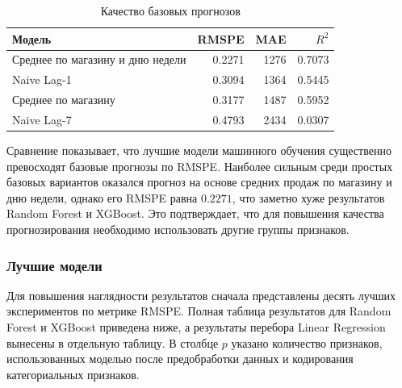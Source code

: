 \documentclass[12pt,a4paper]{article}
\numberwithin{equation}{section}
\begin{document}
\begin{table}[H]
\centering
\caption{Качество базовых прогнозов}
\label{tab:naive_baselines}
\begin{tabular}{l r r r}
\toprule
Модель & RMSPE & MAE & $R^2$ \\
\midrule
Среднее по магазину и дню недели & 0.2271 & 1276 & 0.7073 \\
Naive Lag-1 & 0.3094 & 1364 & 0.5445 \\
Среднее по магазину & 0.3177 & 1487 & 0.5952 \\
Naive Lag-7 & 0.4793 & 2434 & 0.0307 \\
\bottomrule
\end{tabular}
\end{table}

Сравнение показывает, что лучшие модели машинного обучения существенно превосходят базовые прогнозы по RMSPE. Наиболее сильным среди простых базовых вариантов оказался прогноз на основе средних продаж по магазину и дню недели, однако его RMSPE равна \(0.2271\), что заметно хуже результатов Random Forest и XGBoost. Это подтверждает, что для повышения качества прогнозирования необходимо использовать другие группы признаков.

\subsubsection{Лучшие модели}

Для повышения наглядности результатов сначала представлены десять лучших экспериментов по метрике RMSPE. Полная таблица результатов для Random Forest и XGBoost приведена ниже, а результаты перебора Linear Regression вынесены в отдельную таблицу. В столбце \(p\) указано количество признаков, использованных моделью после предобработки данных и кодирования категориальных признаков.
\end{document}
